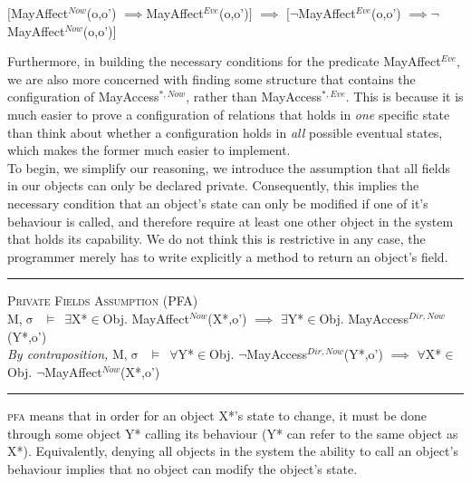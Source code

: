 \documentclass[a4paper,11pt, twoside,twocolumn]{article}
\newenvironment{logic}[1][null]
{\begin{flushleft} \small \label{#1}}
{\end{flushleft}}
\newcommand{\loin}{$\in$}
\newcommand{\loforall}{$\forall$}
\newcommand{\loexists}{$\exists$}
\newcommand{\loimplies}{$\implies$}
\newcommand{\losigma}{$\upsigma$}
\newcommand{\loturns} {$\vDash$}
\newcommand{\loneg}{$\boldsymbol \neg$}
\newcommand{\ablock} {\null\qquad}
\begin{document}
\begin{logic}
$[$MayAffect$^{Now}$(o,o') \loimplies MayAffect$^{Eve}$(o,o')$]$\linebreak
\ablock \loimplies\linebreak
$[$\loneg MayAffect$^{Eve}$(o,o') \loimplies \loneg MayAffect$^{Now}$(o,o')$]$\\
\end{logic}

Furthermore, in building the necessary conditions for the predicate MayAffect$^{Eve}$, we are also more concerned with finding some structure that contains the configuration of MayAccess$^{*,Now}$, rather than MayAccess$^{*,Eve}$. This is because it is much easier to prove a configuration of relations that holds in \textit{one} specific state than think about whether a configuration holds in \textit{all} possible eventual states, which makes the former much easier to implement.\\

To begin, we simplify our reasoning, we introduce the assumption that all fields in our objects can only be declared private. Consequently, this implies the necessary condition that an object's state can only be modified if one of it's behaviour is called, and therefore require at least one other object in the system that holds its capability. We do not think this is restrictive in any case, the programmer merely has to write explicitly a method to return an object's field.

\begin{logic}
\hrule\null
\textsc{\normalsize *Private Fields Assumption (PFA)}\\
M,\losigma\ \loturns\ \loexists X*\loin Obj. MayAffect$^{Now}$(X*,o') \loimplies \linebreak
	\ablock \ablock \loexists Y*\loin Obj. MayAccess$^{Dir,Now}$(Y*,o')
\linebreak \\
\textit{By contraposition,}\linebreak
M,\losigma\ \loturns\ 	\loforall Y*\loin Obj. \loneg MayAccess$^{Dir,Now}$(Y*,o') \loimplies \linebreak
	\ablock \ablock \loforall X*\loin Obj. \loneg MayAffect$^{Now}$(X*,o')
\linebreak
\hrule
\end{logic}

\textsc{pfa} means that in order for an object X*'s state to change, it must be done through some object Y* calling its behaviour (Y* can refer to the same object as X*). Equivalently, denying all objects in the system the ability to call an object's behaviour implies that no object can modify the object's state.\\
\end{document}
